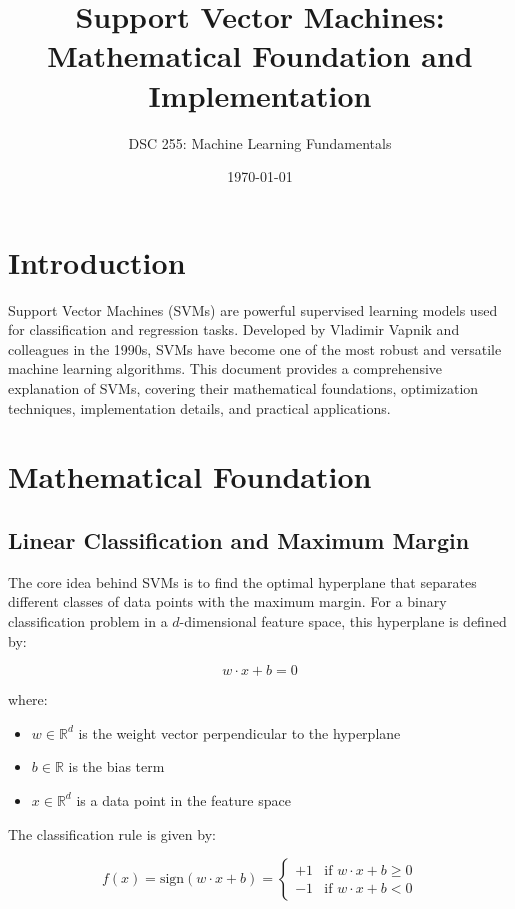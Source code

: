 \documentclass{article}
\title{Support Vector Machines: Mathematical Foundation and Implementation}
\author{DSC 255: Machine Learning Fundamentals}
\date{\today}
\begin{document}
\maketitle

\section{Introduction}

Support Vector Machines (SVMs) are powerful supervised learning models used for classification and regression tasks. Developed by Vladimir Vapnik and colleagues in the 1990s, SVMs have become one of the most robust and versatile machine learning algorithms. This document provides a comprehensive explanation of SVMs, covering their mathematical foundations, optimization techniques, implementation details, and practical applications.

\section{Mathematical Foundation}

\subsection{Linear Classification and Maximum Margin}

The core idea behind SVMs is to find the optimal hyperplane that separates different classes of data points with the maximum margin. For a binary classification problem in a $d$-dimensional feature space, this hyperplane is defined by:

\begin{equation}
w \cdot x + b = 0
\end{equation}

where:
\begin{itemize}
    \item $w \in \mathbb{R}^d$ is the weight vector perpendicular to the hyperplane
    \item $b \in \mathbb{R}$ is the bias term
    \item $x \in \mathbb{R}^d$ is a data point in the feature space
\end{itemize}

The classification rule is given by:

\begin{equation}
f(x) = \text{sign}(w \cdot x + b) = 
\begin{cases}
+1 & \text{if } w \cdot x + b \geq 0 \\
-1 & \text{if } w \cdot x + b < 0
\end{cases}
\end{equation}
\end{document}
